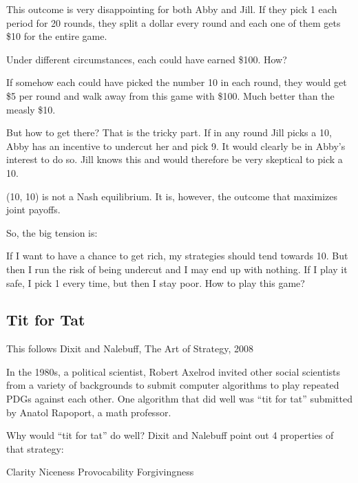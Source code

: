 \documentclass[
]{book}
\begin{document}
This outcome is very disappointing for both Abby and Jill. If they pick 1 each period for 20 rounds, they split a dollar every round and each one of them gets \$10 for the entire game.

Under different circumstances, each could have earned \$100. How?

If somehow each could have picked the number 10 in each round, they would get \$5 per round and walk away from this game with \$100. Much better than the measly \$10.

But how to get there? That is the tricky part. If in any round Jill picks a 10, Abby has an incentive to undercut her and pick 9. It would clearly be in Abby's interest to do so. Jill knows this and would therefore be very skeptical to pick a 10.

(10, 10) is not a Nash equilibrium. It is, however, the outcome that maximizes joint payoffs.

So, the big tension is:

If I want to have a chance to get rich, my strategies should tend towards 10. But then I run the risk of being undercut and I may end up with nothing. If I play it safe, I pick 1 every time, but then I stay poor.
How to play this game?

\hypertarget{tit-for-tat}{%
\subsection{Tit for Tat}\label{tit-for-tat}}

This follows Dixit and Nalebuff, The Art of Strategy, 2008

In the 1980s, a political scientist, Robert Axelrod invited other social scientists from a variety of backgrounds to submit computer algorithms to play repeated PDGs against each other. One algorithm that did well was ``tit for tat'' submitted by Anatol Rapoport, a math professor.

Why would ``tit for tat'' do well? Dixit and Nalebuff point out 4 properties of that strategy:

\begin{center}
Clarity
Niceness
Provocability
Forgivingness

\end{center}
\end{document}
